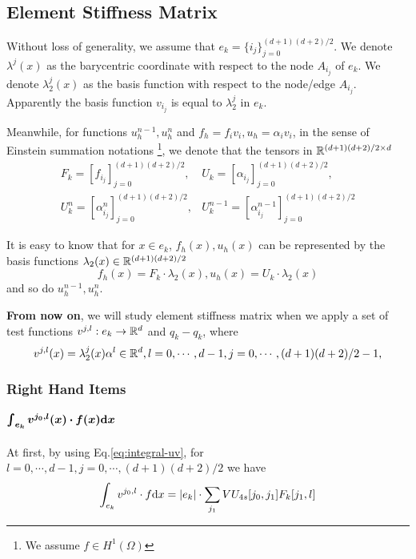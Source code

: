 \subsection{Element Stiffness Matrix}
Without loss of generality, we assume that $e_k=\{i_j\}_{j=0}^{(d+1)(d+2)/2}$.
We denote $\lambda^j(x)$ as the barycentric coordinate with respect to 
the node $A_{i_j}$ of $e_k$. 
We denote $\lambda^j_2(x)$ as the basis function with respect to 
the node/edge $A_{i_j}$.
Apparently the basis function $v_{i_j}$ is equal to $\lambda^j_2$ in $e_k$.

Meanwhile, for functions $u_h^{n-1},u_h^n$ 
and $f_h=f_iv_i,u_h=\alpha_iv_i$, 
in the sense of Einstein summation notations
\footnote{We assume $f\in H^1(\Omega)$}, 
we denote that the tensors in $\mathbb{R}^{(d+1)(d+2)/2\times d}$
\[
  \begin{split}
    F_k=[f_{i_j}]_{j=0}^{(d+1)(d+2)/2},& U_k=[\alpha_{i_j}]_{j=0}^{(d+1)(d+2)/2},\\
    U_{k}^{n}=[\alpha_{i_j}^{n}]_{j=0}^{(d+1)(d+2)/2}, &
    U_{k}^{n-1}=[\alpha_{i_j}^{n-1}]_{j=0}^{(d+1)(d+2)/2} 
  \end{split}
\]

It is easy to know that for $x\in e_k$, $f_h(x),u_h(x)$ can be represented by 
the basis functions $\lambda_2(x)\in\mathbb{R}^{(d+1)(d+2)/2}$
\[f_h(x)=F_k\cdot\lambda_2(x),u_h(x)=U_k\cdot\lambda_2(x)\]
and so do $u_h^{n-1},u_h^n$. 

\textbf{From now on}, we will study element stiffness matrix when we apply 
a set of test functions $v^{j,l}:e_k\to\mathbb{R}^{d}$ and 
$q_k-q_k$, where
\[v^{j,l}(x)=\lambda_2^j(x)\alpha^l\in\mathbb{R}^{d},l=0,\cdots,d-1,j=0,\cdots,(d+1)(d+2)/2-1,\]

\subsubsection{Right Hand Items}
\paragraph{$\bm{\int_{e_k}v^{j_0,l}(x)\cdot f(x)\mathrm{d} x}$}
At first, by using Eq.\eqref{eq:integral-uv}, for 
$l=0,\cdots,d-1,j=0,\cdots,(d+1)(d+2)/2$ we have
\begin{equation}
  \int_{e_k}v^{j_0,l}\cdot f\mathrm{d} x = |e_k|\cdot \sum_{j_1}VU_{4s}[j_0,j_1]F_k[j_1,l]
\end{equation}


